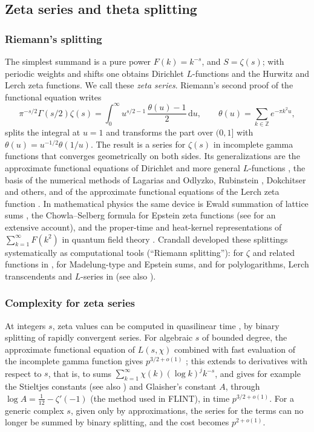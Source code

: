 \documentclass[11pt]{amsart}
\theoremstyle{definition}
\theoremstyle{remark}
\newcommand{\dd}{\,\mathrm{d}}
\newcommand{\ZZ}{\mathbb{Z}}
\begin{document}
\subsection{Zeta series and theta splitting}\label{sec:zetatheta}

\subsubsection{Riemann's splitting}
The simplest summand is a pure power $F(k) = k^{-s}$, and $S = \zeta(s)$; with periodic weights and shifts one
obtains Dirichlet $L$-functions and the Hurwitz and Lerch zeta functions. We call these \emph{zeta series}.
Riemann's second proof of the functional equation \cite{Rie59} writes
\[
  \pi^{-s/2}\Gamma(s/2)\zeta(s) = \int_0^\infty u^{s/2-1}\,\frac{\theta(u)-1}{2}\dd u, \qquad
  \theta(u) = \sum_{k\in\ZZ} e^{-\pi k^2 u},
\]
splits the integral at $u = 1$ and transforms the part over $(0, 1]$
with $\theta(u) = u^{-1/2}\theta(1/u)$. The result is a series for $\zeta(s)$ in incomplete gamma functions that
converges geometrically on both sides. Its generalizations are the approximate functional equations of Dirichlet and
more general $L$-functions \cite{Lav68,CN62}, the basis of the numerical methods of Lagarias and Odlyzko,
Rubinstein \cite{Rub05}, Dokchitser \cite{Dok04} and others, and of the approximate functional equations of the
Lerch zeta function \cite{GLS03}. In mathematical physics the same device is Ewald summation of lattice sums
\cite{Ewa21}, the Chowla--Selberg formula for Epstein zeta functions \cite{CS67} (see \cite{BGMWZ13} for an extensive
account), and the proper-time and heat-kernel representations of $\sum_{k=1}^{\infty} F(k^2)$ in quantum field theory
\cite{Sch51,Eli95,Kir02}. Crandall developed these splittings systematically as computational tools
(``Riemann splitting''): for $\zeta$ and related functions in \cite{BBC00}, for Madelung-type and Epstein sums, and
for polylogarithms, Lerch transcendents and $L$-series in \cite{Cra12} (see also \cite{Cof12}).

\subsubsection{Complexity for zeta series}
At integers $s$, zeta values can be computed in quasilinear time \cite{Kar95,Kar98}, by binary splitting of rapidly
convergent series. For algebraic $s$ of bounded degree, the approximate functional equation of $L(s,\chi)$ combined
with fast evaluation of the incomplete gamma function gives $p^{3/2+o(1)}$ \cite{Joh21}; this extends to
derivatives with respect to $s$, that is, to sums $\sum_{k=1}^{\infty} \chi(k)(\log k)^j k^{-s}$, and gives for example the
Stieltjes constants (see also \cite{Cof14}) and Glaisher's constant $A$, through $\log A = \frac1{12} - \zeta'(-1)$
(the method used in FLINT), in time $p^{3/2+o(1)}$. For a generic complex $s$, given only by approximations, the series for the terms can no longer be
summed by binary splitting, and the cost becomes $p^{2+o(1)}$.
\end{document}
